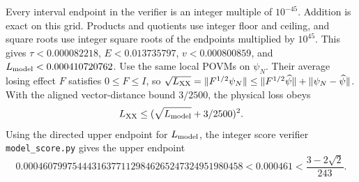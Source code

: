 Every interval endpoint in the verifier is an integer multiple of
$10^{-45}$. Addition is exact on this grid. Products and quotients use
integer floor and ceiling, and square roots use integer square roots of the
endpoints multiplied by $10^{45}$. This gives
$\tau<0.000082218$, $E<0.013735797$, $v<0.000800859$, and
$L_{\rm model}<0.000410720762$. Use the same local POVMs on $\psi_N$.
Their average losing effect $F$ satisfies $0\le F\le I$, so
$\sqrt{L_{\rm XX}}=\|F^{1/2}\psi_N\|
\le\|F^{1/2}\widehat\psi\|+\|\psi_N-\widehat\psi\|$.
With the aligned vector-distance bound $3/2500$, the physical loss obeys
\[
 L_{\rm XX}\le(\sqrt{L_{\rm model}}+3/2500)^2.
\]
Using the directed upper endpoint for $L_{\rm model}$, the integer
score verifier \texttt{model\_score.py} gives the upper endpoint
\[
 0.000460799754443163771129846265247324951980458
 <0.000461<\frac{3-2\sqrt2}{243}.
\]

